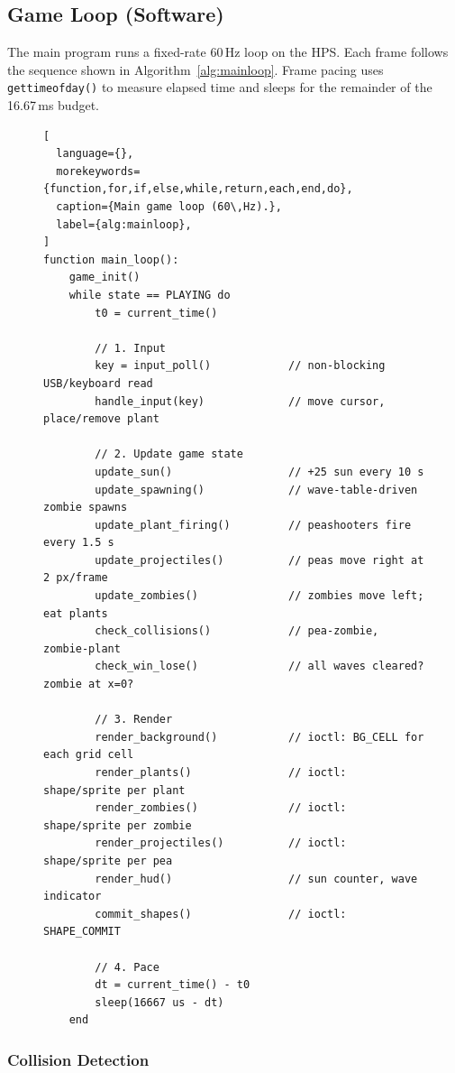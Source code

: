 \documentclass[11pt,letterpaper]{article}
\begin{document}
\subsection{Game Loop (Software)}
\label{sec:algo-gameloop}

The main program runs a fixed-rate 60\,Hz loop on the HPS. Each frame
follows the sequence shown in Algorithm~\ref{alg:mainloop}. Frame pacing
uses \texttt{gettimeofday()} to measure elapsed time and sleeps for the
remainder of the 16.67\,ms budget.

\begin{figure}[H]
\begin{lstlisting}[
  language={},
  morekeywords={function,for,if,else,while,return,each,end,do},
  caption={Main game loop (60\,Hz).},
  label={alg:mainloop},
]
function main_loop():
    game_init()
    while state == PLAYING do
        t0 = current_time()

        // 1. Input
        key = input_poll()            // non-blocking USB/keyboard read
        handle_input(key)             // move cursor, place/remove plant

        // 2. Update game state
        update_sun()                  // +25 sun every 10 s
        update_spawning()             // wave-table-driven zombie spawns
        update_plant_firing()         // peashooters fire every 1.5 s
        update_projectiles()          // peas move right at 2 px/frame
        update_zombies()              // zombies move left; eat plants
        check_collisions()            // pea-zombie, zombie-plant
        check_win_lose()              // all waves cleared? zombie at x=0?

        // 3. Render
        render_background()           // ioctl: BG_CELL for each grid cell
        render_plants()               // ioctl: shape/sprite per plant
        render_zombies()              // ioctl: shape/sprite per zombie
        render_projectiles()          // ioctl: shape/sprite per pea
        render_hud()                  // sun counter, wave indicator
        commit_shapes()               // ioctl: SHAPE_COMMIT

        // 4. Pace
        dt = current_time() - t0
        sleep(16667 us - dt)
    end
\end{lstlisting}
\end{figure}

\subsubsection{Collision Detection}
\end{document}
